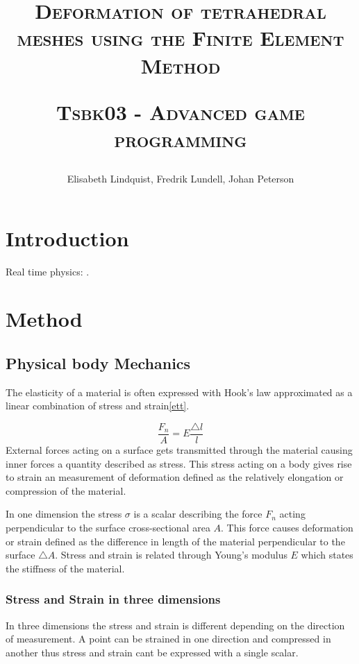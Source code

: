 \documentclass[10pt,a4paper]{article}
\author{Elisabeth Lindquist, Fredrik Lundell, Johan Peterson}
\title{\textsc{Deformation of tetrahedral meshes using the Finite Element Method}\\\begin{small}\textsc{Tsbk03 - Advanced game programming}\end{small}}
\begin{document}
\maketitle
\begin{abstract}

\end{abstract}
\pagebreak
\tableofcontents
\pagebreak

\section{Introduction}

Real time physics: \cite{rt_phys}.
\section{Method}

\subsection{Physical body Mechanics}
The elasticity of a material is often expressed with Hook's law approximated as a linear combination of stress and strain\ref{ett}.

\begin{equation}\label{ett}
    \frac{F_{n}}{A} = E \frac{\triangle l}{l}
\end{equation}
External forces acting on a surface gets transmitted through the material causing inner forces a quantity described as stress. This stress acting on a body gives rise to strain an measurement of deformation defined as the relatively elongation or compression of the material.

In one dimension the stress $\sigma$ is a scalar describing the force $ F_{n}$ acting perpendicular to the surface cross-sectional area $A$.
This force causes deformation or strain defined as the difference in length of the material perpendicular to the surface $\triangle A$. Stress and strain is related through Young's modulus $E$ which states the stiffness of the material.

\subsubsection{Stress and Strain in three dimensions}
In three dimensions the stress and strain is different depending on the direction of measurement. A point can be strained in one direction and compressed in another thus stress and strain cant be expressed with a single scalar.
\end{document}
